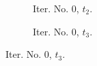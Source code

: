 \documentclass[a4paper,12pt]{amsart}
\numberwithin{equation}{section}
\begin{document}
\begin{figure}[h!]
\begin{subfigure}[t]{0.23\textwidth}
    \caption{Iter. No. 0, $t_2$.}
\end{subfigure}
	\hfill
\begin{subfigure}[t]{0.23\textwidth}
    \caption{Iter. No. 0, $t_3$.}
\end{subfigure}
	

\end{figure}
\end{document}
